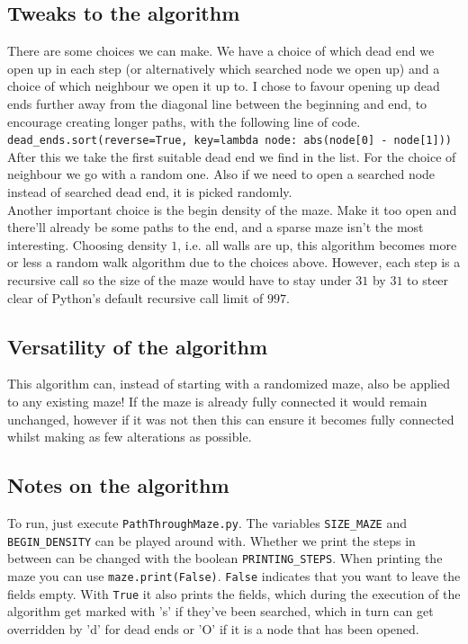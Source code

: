 \documentclass[10pt, a4paper, twoside]{amsart}
\newcommand{\1}{\mathbbm{1}}
\begin{document}
\subsection{Tweaks to the algorithm}
There are some choices we can make.
We have a choice of which dead end we open up in each step (or alternatively which searched node we open up) and a choice of which neighbour we open it up to.
I chose to favour opening up dead ends further away from the diagonal line between the beginning and end, to encourage creating longer paths, with the following line of code.\\
\verb+dead_ends.sort(reverse=True, key=lambda node: abs(node[0] - node[1]))+\\
After this we take the first suitable dead end we find in the list. For the choice of neighbour we go with a random one. Also if we need to open a searched node instead of searched dead end, it is picked randomly.\\

Another important choice is the begin density of the maze. Make it too open and there'll already be some paths to the end, and a sparse maze isn't the most interesting. Choosing density $1$, i.e. all walls are up, this algorithm becomes more or less a random walk algorithm due to the choices above. However, each step is a recursive call so the size of the maze would have to stay under $31$ by $31$ to steer clear of Python's default recursive call limit of $997$.


\subsection{Versatility of the algorithm}
This algorithm can, instead of starting with a randomized maze, also be applied to any existing maze! If the maze is already fully connected it would remain unchanged, however if it was not then this can ensure it becomes fully connected whilst making as few alterations as possible.

\subsection{Notes on the algorithm}
To run, just execute \verb+PathThroughMaze.py+. The variables \verb+SIZE_MAZE+ and \verb+BEGIN_DENSITY+ can be played around with. Whether we print the steps in between can be changed with the boolean \verb+PRINTING_STEPS+. When printing the maze you can use \verb+maze.print(False)+. \verb+False+ indicates that you want to leave the fields empty. With \verb+True+ it also prints the fields, which during the execution of the algorithm get marked with 's' if they've been searched, which in turn can get overridden by 'd' for dead ends or 'O' if it is a node that has been opened.\\
\end{document}
